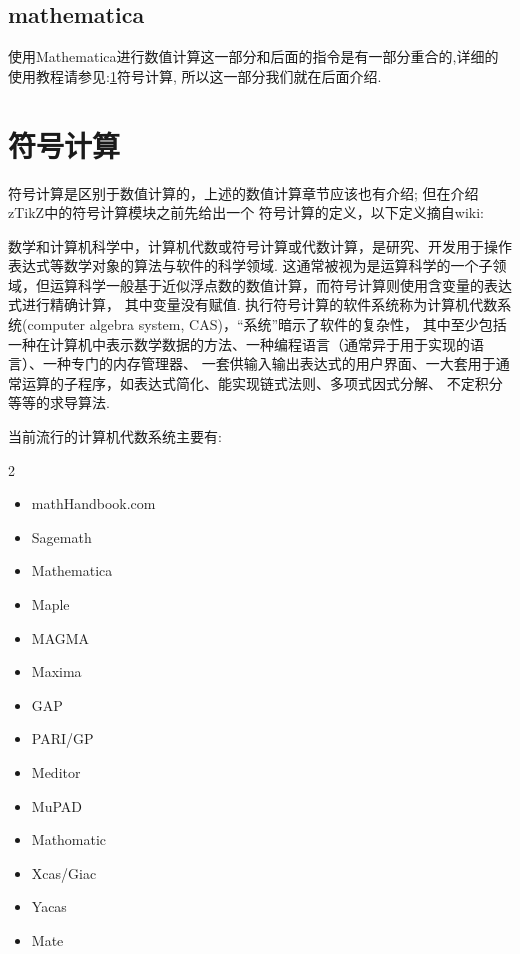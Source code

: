 \documentclass[
  hyper,    
  lang=cn,
  class=book,
  bib_index={load},
  mathSpec={envStyle=leftbar, alias},
  toc={column=2, title=目录},
]{zlatex}
\let\cmd\ztexverb
\begin{document}
\subsection{mathematica}
使用Mathematica进行数值计算这一部分和后面的\cmd{\wolfram}\index{\cmd{\wolfram}}指令是有一部分重合的,详细的
使用教程请参见:\cref{sec:symbol}符号计算, 所以这一部分我们就在后面介绍.


\section{符号计算}\label{sec:symbol}
符号计算是区别于数值计算的，上述的数值计算章节应该也有介绍; 但在介绍zTikZ中的符号计算模块之前先给出一个
符号计算的定义，以下定义摘自wiki:

\begin{leftbar}
\kaishu 数学和计算机科学中，计算机代数或符号计算或代数计算，是研究、开发用于操作表达式等数学对象的算法与软件的科学领域.
这通常被视为是运算科学的一个子领域，但运算科学一般基于近似浮点数的数值计算，而符号计算则使用含变量的表达式进行精确计算，
其中变量没有赋值. 执行符号计算的软件系统称为计算机代数系统(computer algebra system, CAS)，``系统''暗示了软件的复杂性，
其中至少包括一种在计算机中表示数学数据的方法、一种编程语言（通常异于用于实现的语言）、一种专门的内存管理器、
一套供输入输出表达式的用户界面、一大套用于通常运算的子程序，如表达式简化、能实现链式法则、多项式因式分解、
不定积分等等的求导算法.
\end{leftbar}

当前流行的计算机代数系统主要有:
\begin{multicols}{2}
    \begin{itemize}
    \item mathHandbook.com
    \item Sagemath
    \item Mathematica
    \item Maple
    \item MAGMA
    \item Maxima
    \item GAP
    \item PARI/GP
    \item Meditor
    \item MuPAD
    \item Mathomatic
    \item Xcas/Giac
    \item Yacas
    \item Mate
    \end{itemize}
\end{multicols}
\end{document}
